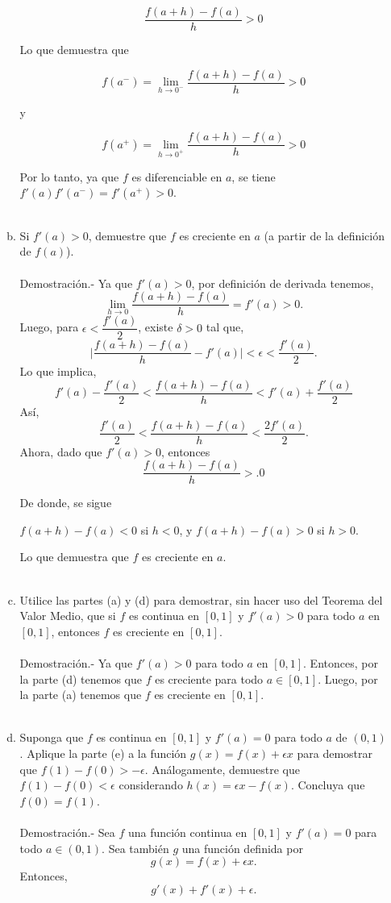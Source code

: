 \begin{enumerate}[\bfseries 1.]
\begin{enumerate}[(a)]
		$$\dfrac{f(a+h)-f(a)}{h}>0$$

		Lo que demuestra que

		$$f\left(a^-\right)=\lim_{h\to 0^-}\dfrac{f(a+h)-f(a)}{h}>0$$

		y 

		$$f\left(a^+\right)=\lim_{h\to 0^+}\dfrac{f(a+h)-f(a)}{h}>0$$

		Por lo tanto, ya que $f$ es diferenciable en $a$, se tiene 
		$f'(a)f'\left(a^-\right)=f'\left(a^+\right)>0$.\\\\

	    \item Si $f'(a)>0$, demuestre que $f$ es creciente en $a$ (a partir de la definición de $f(a)$).\\\\
		Demostración.-\; Ya que $f'(a)>0$, por definición de derivada tenemos,
		$$\lim_{h\to 0}\dfrac{f(a+h)-f(a)}{h}=f'(a)>0.$$
		Luego, para $\epsilon<\dfrac{f'(a)}{2}$, existe $\delta>0$ tal que,
		$$\bigg|\dfrac{f(a+h)-f(a)}{h}-f'(a)\bigg|<\epsilon<\dfrac{f'(a)}{2}.$$
		Lo que implica, 
		$$f'(a)-\dfrac{f'(a)}{2}<\dfrac{f(a+h)-f(a)}{h}<f'(a)+\dfrac{f'(a)}{2}$$
		Así, 
		$$\dfrac{f'(a)}{2}<\dfrac{f(a+h)-f(a)}{h}<\dfrac{2f'(a)}{2}.$$
		Ahora, dado que $f'(a)>0$, entonces
		$$\dfrac{f(a+h)-f(a)}{h}>.0$$

		De donde, se sigue
		\begin{center}
		    $f(a+h)-f(a)<0$ si $h<0$, y $f(a+h)-f(a)>0$ si $h>0$.
		\end{center}

		Lo que demuestra que $f$ es creciente en $a$.\\\\


	    \item Utilice las partes (a) y (d) para demostrar, sin hacer uso del Teorema del Valor Medio, que si $f$ es continua en $[0,1]$ y $f'(a)>0$ para todo $a$ en $[0,1]$, entonces $f$ es creciente en $[0,1]$.\\\\
		Demostración.-\; Ya que $f'(a)>0$ para todo $a$ en $[0,1]$. Entonces, por la parte (d) tenemos que $f$ es creciente para todo $a\in [0,1]$. Luego, por la parte (a) tenemos que $f$ es creciente en $[0,1]$.\\\\

	    \item Suponga que $f$ es continua en $[0,1]$ y $f'(a)=0$ para todo $a$ de $(0,1)$. Aplique la parte (e) a la función $g(x)=f(x)+\epsilon x$ para demostrar que $f(1)-f(0)>-\epsilon$. Análogamente, demuestre que $f(1)-f(0)<\epsilon$ considerando $h(x)=\epsilon x-f(x)$. Concluya que $f(0)=f(1)$.\\\\
		Demostración.-\; Sea $f$ una función continua en $[0,1]$ y $f'(a)=0$ para todo $a\in (0,1)$. Sea también $g$ una función definida por
		$$g(x)=f(x)+\epsilon x.$$
		Entonces, 
		$$g'(x)+f'(x)+\epsilon.$$


\end{enumerate}
\end{enumerate}
